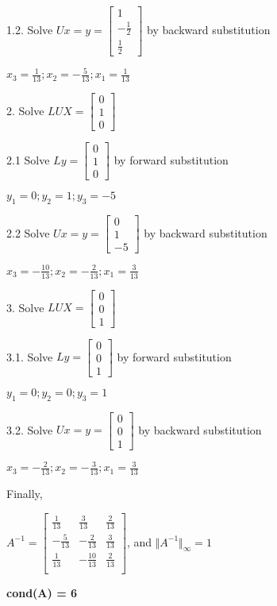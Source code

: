 \begin{exercise}{5}
1.2. Solve $Ux=y=\begin{bmatrix} 1\\-\frac{1}{2}\\\frac{1}{2}\end{bmatrix}$
by backward substitution
\begin{center}
$x_3=\frac{1}{13};x_2=-\frac{5}{13};x_1=\frac{1}{13}$
\end{center}

2. Solve $LUX=\begin{bmatrix} 0\\1\\0\end{bmatrix}$

2.1 Solve $Ly=\begin{bmatrix} 0\\1\\0\end{bmatrix}$ by forward substitution
\begin{center}
$y_1 = 0; y_2=1;y_3=-5$
\end{center}

2.2 Solve $Ux=y=\begin{bmatrix} 0\\1\\-5\end{bmatrix}$ by backward substitution
\begin{center}
$x_3=-\frac{10}{13};x_2=-\frac{2}{13};x_1=\frac{3}{13}$
\end{center}

3. Solve $LUX=\begin{bmatrix} 0\\0\\1\end{bmatrix}$

3.1. Solve $Ly=\begin{bmatrix} 0\\0\\1\end{bmatrix}$ by forward substitution
\begin{center}
$y_1 = 0; y_2=0;y_3=1$
\end{center}

3.2. Solve $Ux=y=\begin{bmatrix} 0\\0\\1\end{bmatrix}$ by backward substitution
\begin{center}
$x_3=-\frac{2}{13};x_2=-\frac{3}{13};x_1=\frac{3}{13}$
\end{center}

Finally,
\begin{center}
$A^{-1} = \begin{bmatrix}
\frac{1}{13}&\frac{3}{13}&\frac{2}{13}\\ 
-\frac{5}{13}&-\frac{2}{13}&\frac{3}{13}\\ 
\frac{1}{13}&-\frac{10}{13}&\frac{2}{13}\\ 
\end{bmatrix}
$, and $\Vert A^{-1} \Vert _\infty = 1$ \\
\end{center}

\textbf{cond(A) = 6}
\end{exercise}
